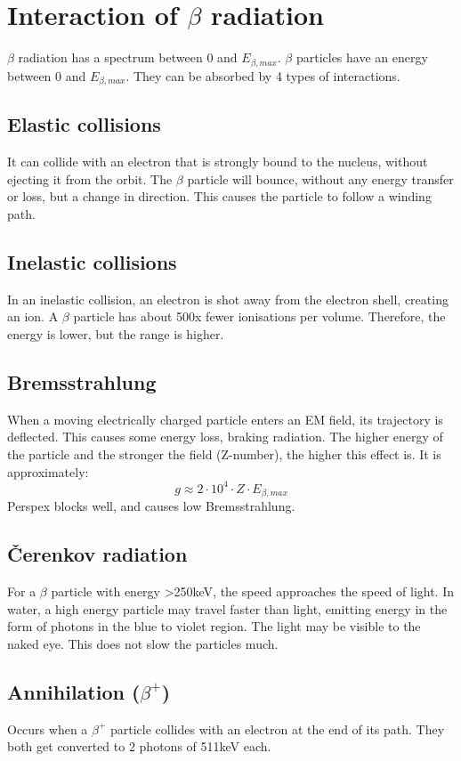 \section{Interaction of $\beta$ radiation}
$\beta$ radiation has a spectrum between 0 and $E_{\beta,max}$. $\beta$ particles have an energy between 0 and $E_{\beta,max}$. They can be absorbed by 4 types of interactions.
\subsection{Elastic collisions}
It can collide with an electron that is strongly bound to the nucleus, without ejecting it from the orbit. The $\beta$ particle will bounce, without any energy transfer or loss, but a change in direction. This causes the particle to follow a winding path.
\subsection{Inelastic collisions}
In an inelastic collision, an electron is shot away from the electron shell, creating an ion. A $\beta$ particle has about 500x fewer ionisations per volume. Therefore, the energy is lower, but the range is higher.
\subsection{Bremsstrahlung}
When a moving electrically charged particle enters an EM field, its trajectory is deflected. This causes some energy loss, braking radiation. The higher energy of the particle and the stronger the field (Z-number), the higher this effect is. It is approximately:
\[g \approx 2\cdot10^4\cdot Z\cdot E_{\beta,max}\]
Perspex blocks well, and causes low Bremsstrahlung.
\subsection{Čerenkov radiation}
For a $\beta$ particle with energy >250keV, the speed approaches the speed of light. In water, a high energy particle may travel faster than light, emitting energy in the form of photons in the blue to violet region. The light may be visible to the naked eye. This does not slow the particles much.
\subsection{Annihilation ($\beta^+$)}
Occurs when a $\beta^+$ particle collides with an electron at the end of its path. They both get converted to 2 photons of 511keV each.
